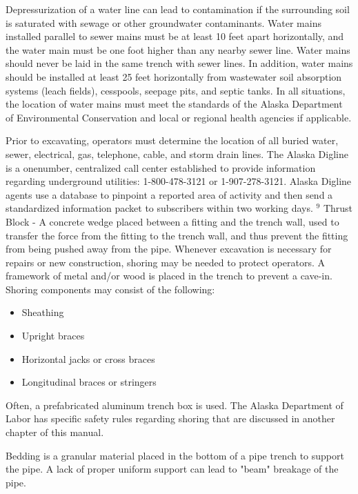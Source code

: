 \documentclass[10pt]{article}
\begin{document}
Depressurization of a water line can lead to contamination if the surrounding soil is saturated with sewage or other groundwater contaminants. Water mains installed parallel to sewer mains must be at least 10 feet apart horizontally, and the water main must be one foot higher than any nearby sewer line. Water mains should never be laid in the same trench with sewer lines. In addition, water mains should be installed at least 25 feet horizontally from wastewater soil absorption systems (leach fields), cesspools, seepage pits, and septic tanks. In all situations, the location of water mains must meet the standards of the Alaska Department of Environmental Conservation and local or regional health agencies if applicable.

Prior to excavating, operators must determine the location of all buried water, sewer, electrical, gas, telephone, cable, and storm drain lines. The Alaska Digline is a onenumber, centralized call center established to provide information regarding underground utilities: 1-800-478-3121 or 1-907-278-3121. Alaska Digline agents use a database to pinpoint a reported area of activity and then send a standardized information packet to subscribers within two working days. ${ }^{9}$ Thrust Block - A concrete wedge placed between a fitting and the trench wall, used to transfer the force from the fitting to the trench wall, and thus prevent the fitting from being pushed away from the pipe. Whenever excavation is necessary for repairs or new construction, shoring may be needed to protect operators. A framework of metal and/or wood is placed in the trench to prevent a cave-in. Shoring components may consist of the following:

\begin{itemize}
  \item Sheathing

  \item Upright braces

  \item Horizontal jacks or cross braces

  \item Longitudinal braces or stringers

\end{itemize}
Often, a prefabricated aluminum trench box is used. The Alaska Department of Labor has specific safety rules regarding shoring that are discussed in another chapter of this manual.

Bedding is a granular material placed in the bottom of a pipe trench to support the pipe. A lack of proper uniform support can lead to "beam" breakage of the pipe.
\end{document}
